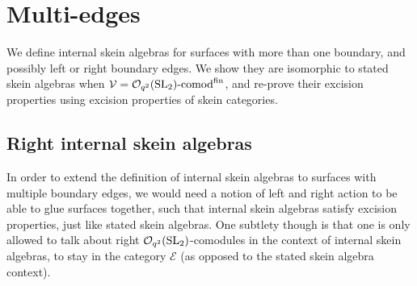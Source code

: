 \documentclass[pdftex]{sigma}%
\numberwithin{equation}{section}
\newcommand{\Oqcomfin}{\Oq\text{-}{\rm comod}^{\rm fin}}
\newcommand{\Oq}{\mathcal{O}_{q^2}({\rm SL}_2)}
\begin{document}
\section{Multi-edges}\label{SectMultiEdges}
We define internal skein algebras for surfaces with more than one boundary, and possibly left or right boundary edges. We show they are isomorphic to stated skein algebras when $\mathcal{V} = \Oqcomfin$, and re-prove their excision properties using excision properties of skein categories.

\subsection{Right internal skein algebras}
In order to extend the definition of internal skein algebras to surfaces with multiple boundary edges, we would need a notion of left and right action to be able to glue surfaces together, such that internal skein algebras satisfy excision properties, just like stated skein algebras. One subtlety though is that one is only allowed to talk about right $\Oq$-comodules in the context of internal skein algebras, to stay in the category $\mathcal{E}$ (as opposed to the stated skein algebra context).
\end{document}
